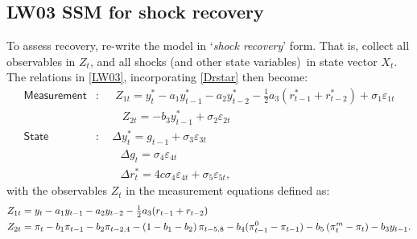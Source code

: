 \documentclass[a4paper,12pt]{article}
\newcommand{\bsq}{\begin{subequations}}\newcommand{\esq}{\end{subequations}}
\newcommand{\vsp}[1]{\vspace*{#1mm}}\newcommand{\hsp}[1]{\hspace*{#1mm}}  }
\begin{document}
\subsection{LW03 SSM for shock recovery}

To assess recovery, re-write the model in `\emph{shock recovery}' form. That
is, collect all observables in $Z_{t}$, and all shocks (and other state
variables)\ in state vector $X_{t}$. The relations in \ref{LW03},
incorporating \ref{Drstar} then become:\bsq\label{ssm0}%
\begin{align}
\mathsf{Measurement}& :\;\quad Z_{1t}=y_{t}^{\ast }-a_{1}y_{t-1}^{\ast
}-a_{2}y_{t-2}^{\ast }-\tfrac{1}{2}a_{3}\left( r_{t-1}^{\ast }+r_{t-2}^{\ast
}\right) +\sigma _{1}\varepsilon _{1t} \\
\phantom{\mathsf{Measurement}}& \,\,\;\;\phantom{:\quad}%
Z_{2t}=-b_{3}y_{t-1}^{\ast }+\sigma _{2}\varepsilon _{2t} \\
\mathsf{State}& :\quad \Delta y_{t}^{\ast }=g_{t-1}+\sigma _{3}\varepsilon
_{3t} \\
\phantom{\mathsf{State}}& \;\,\;\phantom{:\quad}\Delta g_{t}=\sigma
_{4}\varepsilon _{4t} \\
\phantom{\mathsf{State}}& \;\,\;\phantom{:\quad}\Delta r_{t}^{\ast
}=4c\sigma _{4}\varepsilon _{4t}+\sigma _{5}\varepsilon _{5t},
\end{align}%
\esq with the observables $Z_{t}$ in the measurement equations defined as:%
\vsp{-3}
\begin{align}
Z_{1t}& =y_{t}-a_{1}y_{t-1}-a_{2}y_{t-2}-\tfrac{1}{2}a_{3}(r_{t-1}+r_{t-2})
\notag \\
Z_{2t}& =\pi _{t}-b_{1}\pi _{t-1}-b_{2}\pi _{t-2,4}-\left(
1-b_{1}-b_{2}\right) \pi _{t-5,8}-b_{4}(\pi _{t-1}^{0}-\pi
_{t-1})-b_{5}\left( \pi _{t}^{m}-\pi _{t}\right) -b_{3}y_{t-1}.  \notag
\end{align}%
\end{document}
